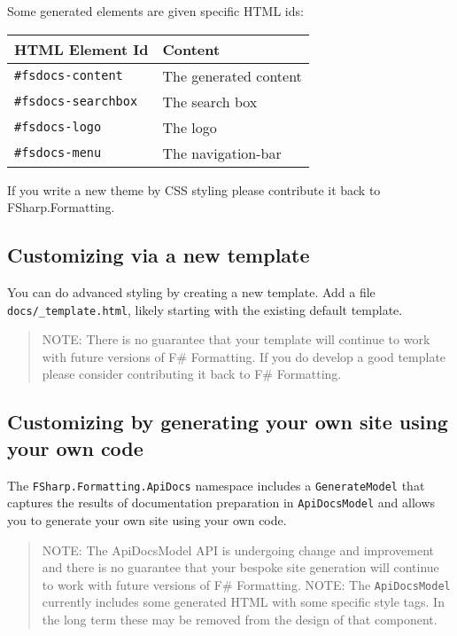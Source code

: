 \documentclass{article}
\begin{document}
Some generated elements are given specific HTML ids:
\begin{tabular}{|l|l|}\hline
\textbf{HTML Element Id} & \textbf{Content}\\ \hline\hline
\texttt{\#fsdocs-content} & The generated content\\ \hline
\texttt{\#fsdocs-searchbox} & The search box\\ \hline
\texttt{\#fsdocs-logo} & The logo\\ \hline
\texttt{\#fsdocs-menu} & The navigation-bar\\ \hline
\end{tabular}



If you write a new theme by CSS styling please contribute it back to FSharp.Formatting.
\subsection*{Customizing via a new template}



You can do advanced styling by creating a new template.  Add a file \texttt{docs/\_template.html}, likely starting
with the existing default template.
\begin{quote}


NOTE: There is no guarantee that your template will continue to work with future versions of F\# Formatting.
If you do develop a good template please consider contributing it back to F\# Formatting.
\end{quote}

\subsection*{Customizing by generating your own site using your own code}



The \texttt{FSharp.Formatting.ApiDocs} namespace includes a \texttt{GenerateModel} that captures
the results of documentation preparation in \texttt{ApiDocsModel} and allows you to
generate your own site using your own code.
\begin{quote}


NOTE: The ApiDocsModel API is undergoing change and improvement and there is no guarantee that your bespoke site generation will continue to work
with future versions of F\# Formatting.
NOTE: The \texttt{ApiDocsModel} currently includes some generated HTML with some specific style tags.
In the long term these may be removed from the design of that component.
\end{quote}
\end{document}

